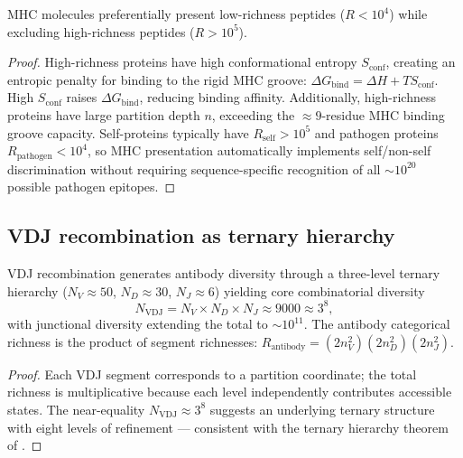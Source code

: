 \begin{theorem}
\label{thm:ch07-mhc-selectivity}
MHC molecules preferentially present low-richness peptides ($R < 10^4$)
while excluding high-richness peptides ($R > 10^5$).
\end{theorem}

\begin{proof}
High-richness proteins have high conformational entropy $S_{\mathrm{conf}}$,
creating an entropic penalty for binding to the rigid MHC groove:
$\Delta G_{\mathrm{bind}} = \Delta H + T S_{\mathrm{conf}}$.  High
$S_{\mathrm{conf}}$ raises $\Delta G_{\mathrm{bind}}$, reducing binding
affinity.  Additionally, high-richness proteins have large partition depth
$n$, exceeding the $\approx 9$-residue MHC binding groove capacity.
Self-proteins typically have $R_{\mathrm{self}} > 10^5$ and pathogen
proteins $R_{\mathrm{pathogen}} < 10^4$, so MHC presentation automatically
implements self/non-self discrimination without requiring sequence-specific
recognition of all $\sim 10^{20}$ possible pathogen epitopes.
\end{proof}

\subsection{VDJ recombination as ternary hierarchy}

\begin{theorem}
\label{thm:ch07-vdj}
VDJ recombination generates antibody diversity through a three-level ternary
hierarchy ($N_V \approx 50$, $N_D \approx 30$, $N_J \approx 6$) yielding
core combinatorial diversity
\begin{equation}
  N_{\mathrm{VDJ}} = N_V \times N_D \times N_J \approx 9000 \approx 3^8,
  \label{eq:ch07-vdj}
\end{equation}
with junctional diversity extending the total to $\sim 10^{11}$.
The antibody categorical richness is the product of segment richnesses:
$R_{\mathrm{antibody}} = (2n_V^2)(2n_D^2)(2n_J^2)$.
\end{theorem}

\begin{proof}
Each VDJ segment corresponds to a partition coordinate; the total richness
is multiplicative because each level independently contributes accessible
states.  The near-equality $N_{\mathrm{VDJ}} \approx 3^8$ suggests an
underlying ternary structure with eight levels of refinement — consistent
with the ternary hierarchy theorem of .
\end{proof}

